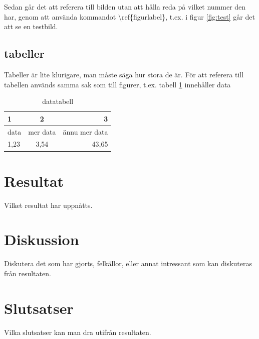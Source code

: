 \documentclass[12pt, a4paper]{article}
\begin{document}
Sedan går det att referera till bilden utan att hålla reda på vilket nummer den har, genom att använda kommandot \textbackslash ref\{figurlabel\}, t.ex.
i figur \ref{fig:test} går det att se en testbild.

\subsection{tabeller}
Tabeller är lite klurigare, man måste säga hur stora de är. För att referera till tabellen används samma sak som till figurer, t.ex. tabell \ref{tab:tabelldata} innehåller data

\begin{table}[H]
	\centering
	\caption{datatabell}
	\label{tab:tabelldata}
	\begin{tabular}{|l|c|r|}
\hline
\textbf{1} & \textbf{2} &  \textbf{3} \\
\hline
\hline
data & mer data & ännu mer data \\
\hline
1,23 & 3,54 & 43,65 \\
\hline 
	\end{tabular}
\end{table}

\section{Resultat}

Vilket resultat har uppnåtts.

\section{Diskussion}

Diskutera det som har gjorts, felkällor, eller annat intressant som kan diskuteras från resultaten.

\section{Slutsatser}

Vilka slutsatser kan man dra utifrån resultaten.

\newpage
\printbibliography
\end{document}
